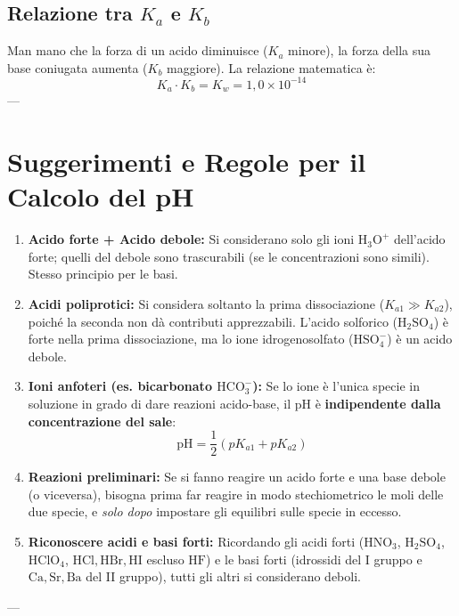 \documentclass[11pt, a4paper, openright]{book}
\begin{document}
\subsection[Relazione tra Ka e Kb]{Relazione tra $K_a$ e $K_b$}
Man mano che la forza di un acido diminuisce ($K_a$ minore), la forza della sua base coniugata aumenta ($K_b$ maggiore). La relazione matematica è:
\begin{equation}
K_a \cdot K_b = K_w = 1{,}0 \times 10^{-14}
\end{equation}
---

\section{Suggerimenti e Regole per il Calcolo del pH}
\begin{enumerate}
    \item \textbf{Acido forte + Acido debole:} Si considerano solo gli ioni $\text{H}_3\text{O}^+$ dell'acido forte; quelli del debole sono trascurabili (se le concentrazioni sono simili). Stesso principio per le basi.
    \item \textbf{Acidi poliprotici:} Si considera soltanto la prima dissociazione ($K_{a1} \gg K_{a2}$), poiché la seconda non dà contributi apprezzabili. L'acido solforico ($\text{H}_2\text{SO}_4$) è forte nella prima dissociazione, ma lo ione idrogenosolfato ($\text{HSO}_4^-$) è un acido debole.
    \item \textbf{Ioni anfoteri (es. bicarbonato $\text{HCO}_3^-$):} Se lo ione è l'unica specie in soluzione in grado di dare reazioni acido-base, il pH è \textbf{indipendente dalla concentrazione del sale}:
    \begin{equation}
    \text{pH} = \frac{1}{2}(pK_{a1} + pK_{a2})
    \end{equation}
    \item \textbf{Reazioni preliminari:} Se si fanno reagire un acido forte e una base debole (o viceversa), bisogna prima far reagire in modo stechiometrico le moli delle due specie, e \textit{solo dopo} impostare gli equilibri sulle specie in eccesso.
    \item \textbf{Riconoscere acidi e basi forti:} Ricordando gli acidi forti ($\text{HNO}_3$, $\text{H}_2\text{SO}_4$, $\text{HClO}_4$, $\text{HCl}, \text{HBr}, \text{HI}$ escluso $\text{HF}$) e le basi forti (idrossidi del I gruppo e $\text{Ca}, \text{Sr}, \text{Ba}$ del II gruppo), tutti gli altri si considerano deboli.
\end{enumerate}
---
\end{document}
